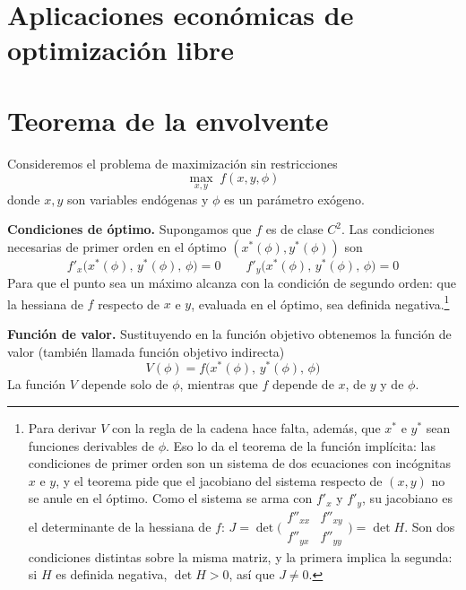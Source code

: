 \documentclass{article}
\begin{document}
\newpage



\section{Aplicaciones económicas de optimización libre}\label{cap:envolvente}

\section*{Teorema de la envolvente}

Consideremos el problema de maximización sin restricciones
\[
\max_{x,y}\;f(x,y,\phi)
\]
donde \(x,y\) son variables endógenas y \(\phi\) es un parámetro exógeno.

\textbf{Condiciones de óptimo.} Supongamos que \(f\) es de clase \(C^2\). Las condiciones necesarias de primer orden en el óptimo \((x^*(\phi),y^*(\phi))\) son
\begin{equation}\label{FOC}
f'_x\bigl(x^*(\phi),\,y^*(\phi),\,\phi\bigr)=0
\qquad
f'_y\bigl(x^*(\phi),\,y^*(\phi),\,\phi\bigr)=0
\end{equation}
Para que el punto sea un máximo alcanza con la condición de segundo orden: que la hessiana de \(f\) respecto de \(x\) e \(y\), evaluada en el óptimo, sea definida negativa.\footnote{Para derivar \(V\) con la regla de la cadena hace falta, además, que \(x^*\) e \(y^*\) sean funciones derivables de \(\phi\). Eso lo da el teorema de la función implícita: las condiciones de primer orden son un sistema de dos ecuaciones con incógnitas \(x\) e \(y\), y el teorema pide que el jacobiano del sistema respecto de \((x,y)\) no se anule en el óptimo. Como el sistema se arma con \(f'_x\) y \(f'_y\), su jacobiano es el determinante de la hessiana de \(f\): \(J=\det\bigl(\begin{smallmatrix} f''_{xx} & f''_{xy}\\ f''_{yx} & f''_{yy}\end{smallmatrix}\bigr)=\det H\). Son dos condiciones distintas sobre la misma matriz, y la primera implica la segunda: si \(H\) es definida negativa, \(\det H>0\), así que \(J\neq0\).}

\textbf{Función de valor.} Sustituyendo en la función objetivo obtenemos la función de valor (también llamada función objetivo indirecta)
\[
V(\phi)=f\bigl(x^*(\phi),\,y^*(\phi),\,\phi\bigr)
\]
La función \(V\) depende solo de \(\phi\), mientras que \(f\) depende de \(x\), de \(y\) y de \(\phi\).
\end{document}
